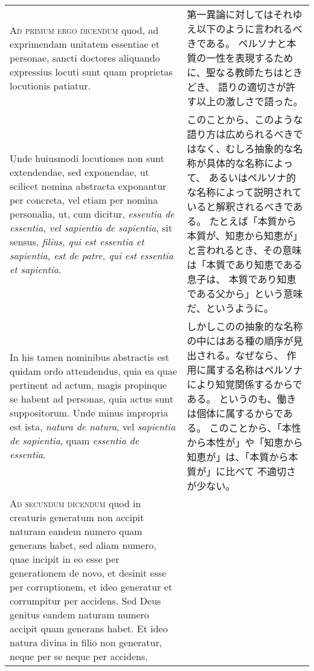 \documentclass[10pt]{jsarticle} %
\begin{document}
\begin{longtable}{p{21em}p{21em}}
\textsc{Ad primum ergo dicendum} quod, ad exprimendam unitatem essentiae et personae,
sancti doctores aliquando expressius locuti sunt quam proprietas locutionis
patiatur. 


&

第一異論に対してはそれゆえ以下のように言われるべきである。
ペルソナと本質の一性を表現するために、聖なる教師たちはときどき、
語りの適切さが許す以上の激しさで語った。

\\


Unde huiusmodi locutiones non sunt extendendae, sed exponendae, ut
scilicet nomina abstracta exponantur per concreta, vel etiam per nomina
personalia, ut, cum dicitur, \textit{essentia de essentia, vel sapientia de sapientia},
sit sensus, \textit{filius, qui est essentia et sapientia, est de patre, qui est
essentia et sapientia}. 


&

このことから、このような語り方は広められるべきではなく、むしろ抽象的な名称が具体的な名称によって、
あるいはペルソナ的な名称によって説明されていると解釈されるべきである。
たとえば「本質から本質が、知恵から知恵が」と言われるとき、その意味は「本質であり知恵である息子は、
本質であり知恵である父から」という意味だ、というように。

\\


In his tamen nominibus abstractis est quidam ordo
attendendus, quia ea quae pertinent ad actum, magis propinque se habent ad
personas, quia actus sunt suppositorum. Unde minus impropria est ista, \textit{natura
de natura}, vel \textit{sapientia de sapientia}, quam \textit{essentia de essentia}.


&

しかしこのの抽象的な名称の中にはある種の順序が見出される。なぜなら、
作用に属する名称はペルソナにより知覚関係するからである。
というのも、働きは個体に属するからである。
このことから、「本性から本性が」や「知恵から知恵が」は、「本質から本質が」に比べて
不適切さが少ない。

\\


\textsc{Ad secundum dicendum} quod in creaturis generatum non accipit naturam eandem
numero quam generans habet, sed aliam numero, quae incipit in eo esse per
generationem de novo, et desinit esse per corruptionem, et ideo generatur et
corrumpitur per accidens. Sed Deus genitus eandem naturam numero accipit quam
generans habet. Et ideo natura divina in filio non generatur, neque per se
neque per accidens.



\end{longtable}
\end{document}
